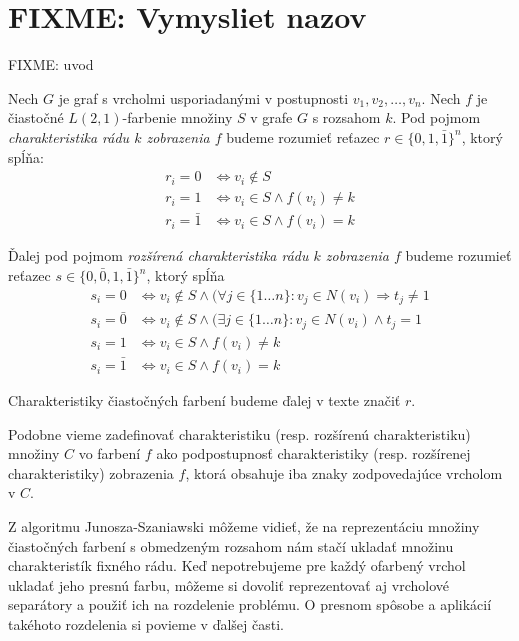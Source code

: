 \chapter{FIXME: Vymysliet nazov}

FIXME: uvod

\begin{defn}
    Nech $G$ je graf s vrcholmi usporiadanými v postupnosti $v_1,v_2, \ldots, v_n$.
    Nech $f$ je čiastočné $L(2,1)$-farbenie množiny $S$ v grafe $G$ s rozsahom $k$. Pod pojmom \emph{charakteristika rádu $k$
    zobrazenia $f$} budeme rozumieť reťazec $r \in \{0, 1, \bar{1}\}^n$, ktorý spĺňa:
    \begin{align*}
        r_i = 0 & \Leftrightarrow v_i \notin S \\
        r_i = 1 & \Leftrightarrow v_i \in S \wedge f(v_i) \neq k \\
        r_i = \bar{1} & \Leftrightarrow v_i \in S \wedge f(v_i) = k
    \end{align*}

    Ďalej pod pojmom \emph{rozšírená charakteristika rádu $k$ zobrazenia $f$} budeme rozumieť reťazec
    $s \in \{0, \bar{0}, 1, \bar{1}\}^n$, ktorý spĺňa
    \begin{align*}
        s_i = 0 & \Leftrightarrow v_i \notin S \wedge (\forall j \in \{1 \dots n\}: v_j \in N(v_i) \Rightarrow t_j \neq 1 \\
        s_i = \bar{0} & \Leftrightarrow v_i \notin S \wedge (\exists j \in \{1 \dots n\}: v_j \in N(v_i) \wedge t_j = 1 \\
        s_i = 1 & \Leftrightarrow v_i \in S \wedge f(v_i) \neq k \\
        s_i = \bar{1} & \Leftrightarrow v_i \in S \wedge f(v_i) = k
    \end{align*}

    Charakteristiky čiastočných farbení budeme ďalej v texte značiť $r$.
\end{defn}

Podobne vieme zadefinovať charakteristiku (resp. rozšírenú charakteristiku) množiny $C$ vo
farbení $f$ ako podpostupnosť charakteristiky (resp. rozšírenej charakteristiky) zobrazenia
$f$, ktorá obsahuje iba znaky zodpovedajúce vrcholom v $C$.

Z algoritmu Junosza-Szaniawski môžeme vidieť, že na reprezentáciu množiny čiastočných farbení
s obmedzeným rozsahom nám stačí ukladať množinu charakteristík fixného rádu. Keď nepotrebujeme
pre každý ofarbený vrchol ukladať jeho presnú farbu, môžeme si dovoliť reprezentovať aj
vrcholové separátory a použiť ich na rozdelenie problému. O presnom spôsobe a aplikácií
takéhoto rozdelenia si povieme v ďalšej časti.

